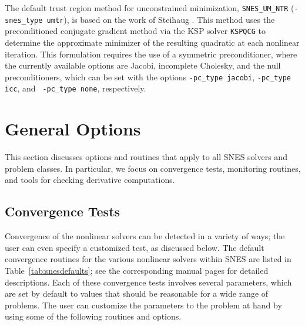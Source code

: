 The default trust region method for unconstrained minimization, 
{\tt SNES\_UM\_NTR} ({\tt -snes\_type umtr}), is based on the work of
Steihaug \cite{steihaug:83}.  This method uses the preconditioned
conjugate gradient method via the KSP solver {\tt KSPQCG} to determine
the approximate minimizer of the resulting quadratic at each nonlinear
iteration.  This formulation requires the use of a symmetric
preconditioner, where the currently available options are Jacobi,
incomplete Cholesky, and the null preconditioners, which can be set
with the options {\tt -pc\_type jacobi}, {\tt -pc\_type icc}, and {\tt
-pc\_type none}, respectively.

\section{General Options}

This section discusses options and routines that apply to all SNES
solvers and problem classes.  In particular, we focus on convergence
tests, monitoring routines, and tools for checking derivative
computations.

\subsection{Convergence Tests}
\label{sec:snesconvergence}

Convergence of the nonlinear solvers can be detected in a variety of
ways; the user can even specify a customized test, as discussed
below.  The default convergence routines for
the various nonlinear solvers within SNES are listed in
Table~\ref{tab:snesdefaults}; see the corresponding manual pages for
detailed descriptions.  Each of these convergence tests involves
several parameters, which are set by default to values that should be
reasonable for a wide range of problems.  The user can customize the
parameters to the problem at hand by using some of the following
routines and options.

